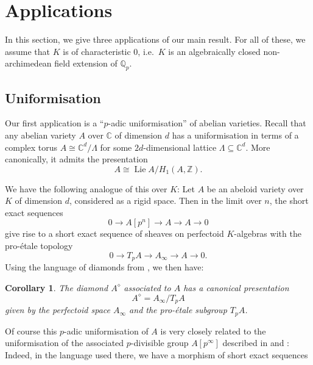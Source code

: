\documentclass[10pt,oneside]{amsart}
\newtheorem{corollary}[theorem]{Corollary}
\theoremstyle{definition}
\newcommand{\Z}{\mathbb{Z}}
\newcommand{\Q}{\mathbb{Q}}
\begin{document}
	
 
	\section{Applications}
	In this section, we give three applications of our main result. For all of these, we assume that $K$ is of characteristic $0$, i.e.\ $K$ is an algebraically closed non-archimedean field extension of $\Q_p$.
	\subsection{Uniformisation}
	Our first application is a ``$p$-adic uniformisation'' of abelian varieties.
	Recall that any abelian variety $A$ over $\mathbb C$ of dimension $d$ has a uniformisation in terms of a complex torus $A\cong \mathbb C^d/\Lambda$ for some $2d$-dimensional lattice $\Lambda\subseteq \mathbb C^d$. More canonically, it admits the presentation
\[
 A\cong \operatorname{Lie} A/H_1(A,\Z).
\]
	
	We have the following analogue of this over $K$: Let $A$ be an abeloid variety over $K$ of dimension $d$, considered as a rigid space. Then in the limit over $n$, the short exact sequences
	\[ 0\to A[p^n]\to A\to A\to 0\]
	give rise to a short exact sequence of sheaves on perfectoid $K$-algebras with the pro-\'etale topology
	\[0\to T_pA \to A_\infty \to A\to 0.\]
	Using the language of diamonds from \cite{etale_cohomology_of_diamonds}, we then have:
	\begin{corollary}
		The diamond $A^{\diamond}$ associated to $A$ has a canonical presentation
		\[A^{\diamond} = A_\infty/T_pA \]
		given by the perfectoid space $A_\infty$ and the pro-\'etale subgroup $T_pA$.
	\end{corollary}
	Of course this $p$-adic uniformisation of $A$ is very closely related to the uniformisation of the associated $p$-divisible group $A[p^\infty]$ described in \cite{SW} and \cite[\S4]{survey}: Indeed, in the language used there, we have a morphism of short exact sequences
	
	\begin{center}
	\end{center}
\end{document}
